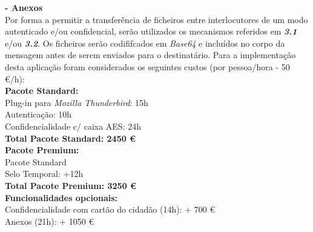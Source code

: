 \documentclass[times, 10pt,twocolumn]{article}
\begin{document}
\noindent \textbf{- Anexos}\\
\indent Por forma a permitir a transfer\^encia de ficheiros entre interlocutores de um modo autenticado e/ou confidencial, ser\~ao utilizados os mecanismos referidos em \emph{\textbf{3.1}} e/ou \emph{\textbf{3.2}}. Os ficheiros ser\~ao codififcados em \emph{Base64} e inclu\'idos no corpo da mensagem antes de serem enviados para o destinat\'ario.
Para a implementa\c{c}\~ao desta aplica\c{c}\~ao foram considerados os seguintes custos (por pessoa/hora - 50 \euro /h):\\

\textbf{Pacote Standard:} \\
\indent \indent Plug-in para \emph{Mozilla Thunderbird}: 15h\\
\indent \indent Autentica\c{c}\~ao: 10h \\
\indent \indent Confidencialidade c/ caixa AES: 24h \\

\textbf{Total Pacote Standard: 2450 \euro} \\

\textbf{Pacote Premium:} \\
 \indent \indent Pacote Standard\\
 \indent \indent Selo Temporal: +12h\\

\textbf{Total Pacote Premium: 3250 \euro} \\

\indent \textbf{Funcionalidades opcionais:}\\
\indent \indent Confidencialidade com cart\~ao do cidad\~ao (14h): + 700 \euro \\
\indent \indent Anexos (21h): + 1050 \euro \\




\nocite{ex1,ex2}


\end{document}
